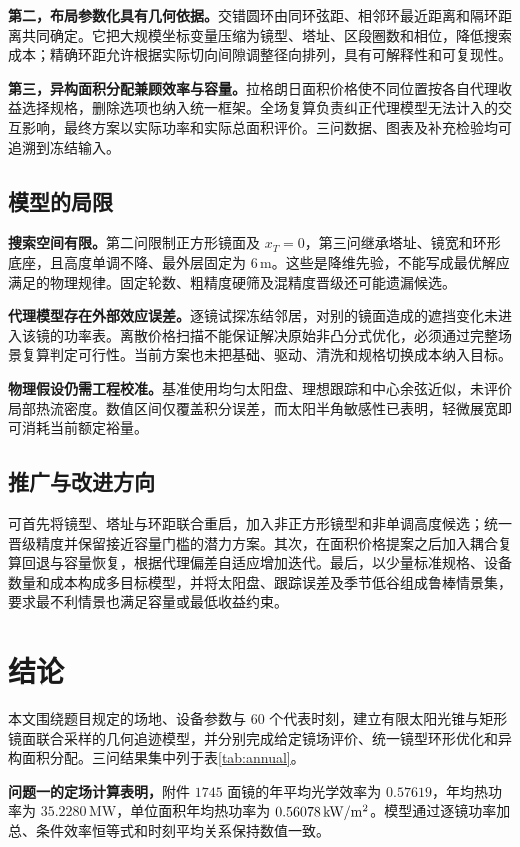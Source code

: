 \textbf{第二，布局参数化具有几何依据。}交错圆环由同环弦距、相邻环最近距离和隔环距离共同确定。它把大规模坐标变量压缩为镜型、塔址、区段圈数和相位，降低搜索成本；精确环距允许根据实际切向间隙调整径向排列，具有可解释性和可复现性。

\textbf{第三，异构面积分配兼顾效率与容量。}拉格朗日面积价格使不同位置按各自代理收益选择规格，删除选项也纳入统一框架。全场复算负责纠正代理模型无法计入的交互影响，最终方案以实际功率和实际总面积评价。三问数据、图表及补充检验均可追溯到冻结输入。

\subsection{模型的局限}
\textbf{搜索空间有限。}第二问限制正方形镜面及 $x_T=0$，第三问继承塔址、镜宽和环形底座，且高度单调不降、最外层固定为 $6\,\mathrm m$。这些是降维先验，不能写成最优解应满足的物理规律。固定轮数、粗精度硬筛及混精度晋级还可能遗漏候选。

\textbf{代理模型存在外部效应误差。}逐镜试探冻结邻居，对别的镜面造成的遮挡变化未进入该镜的功率表。离散价格扫描不能保证解决原始非凸分式优化，必须通过完整场景复算判定可行性。当前方案也未把基础、驱动、清洗和规格切换成本纳入目标。

\textbf{物理假设仍需工程校准。}基准使用均匀太阳盘、理想跟踪和中心余弦近似，未评价局部热流密度。数值区间仅覆盖积分误差，而太阳半角敏感性已表明，轻微展宽即可消耗当前额定裕量。

\subsection{推广与改进方向}
可首先将镜型、塔址与环距联合重启，加入非正方形镜型和非单调高度候选；统一晋级精度并保留接近容量门槛的潜力方案。其次，在面积价格提案之后加入耦合复算回退与容量恢复，根据代理偏差自适应增加迭代。最后，以少量标准规格、设备数量和成本构成多目标模型，并将太阳盘、跟踪误差及季节低谷组成鲁棒情景集，要求最不利情景也满足容量或最低收益约束。

\pagepart
\section{结论}
本文围绕题目规定的场地、设备参数与 $60$ 个代表时刻，建立有限太阳光锥与矩形镜面联合采样的几何追迹模型，并分别完成给定镜场评价、统一镜型环形优化和异构面积分配。三问结果集中列于表\ref{tab:annual}。

\textbf{问题一的定场计算表明，}附件 $1745$ 面镜的年平均光学效率为 $0.57619$，年均热功率为 $35.2280\,\mathrm{MW}$，单位面积年均热功率为 $0.56078\,\mathrm{kW}/\mathrm{m}^2$。模型通过逐镜功率加总、条件效率恒等式和时刻平均关系保持数值一致。

